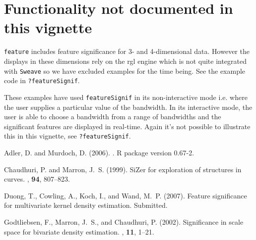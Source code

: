 \documentclass[a4paper,11pt]{article}
\begin{document}
\section{Functionality not documented in this vignette}

\texttt{feature} includes 
feature significance for 3- and 4-dimensional
data. However the displays in these dimensions rely on the rgl engine
\citep{rgl} which is not quite integrated with \texttt{Sweave} 
so we have excluded examples for the time being. See 
the example code in \texttt{?featureSignif}.   

These examples have used \texttt{featureSignif} in its non-interactive
mode i.e. where the user supplies a particular value of the bandwidth. 
In its interactive mode, the user is able to choose a
bandwidth from a range of bandwidths and the significant features are
displayed in real-time.
Again it's not possible to illustrate this in this vignette,
see \texttt{?featureSignif}.   
 



%

\begin{thebibliography}{}

Adler, D. and Murdoch, D. (2006).
.
\newblock R package version 0.67-2.

Chaudhuri, P. and Marron, J.~S. (1999).
\newblock Si{Z}er for exploration of structures in curves.
, \textbf{94}, 807--823.

Duong, T., Cowling, A., Koch, I., and Wand, M.~P. (2007).
\newblock Feature significance for multivariate kernel density estimation.
\newblock Submitted.

Godtliebsen, F., Marron, J.~S., and Chaudhuri, P. (2002).
\newblock Significance in scale space for bivariate density estimation.
, \textbf{11}, 1--21.

\end{thebibliography}
\end{document}
